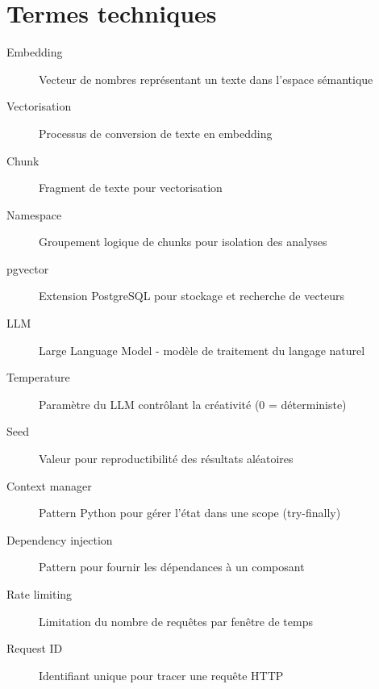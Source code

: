 \documentclass[12pt,a4paper,oneside]{book}
\begin{document}
\section{Termes techniques}

\begin{description}
    \item[Embedding] Vecteur de nombres représentant un texte dans l'espace sémantique
    
    \item[Vectorisation] Processus de conversion de texte en embedding
    
    \item[Chunk] Fragment de texte pour vectorisation
    
    \item[Namespace] Groupement logique de chunks pour isolation des analyses
    
    \item[pgvector] Extension PostgreSQL pour stockage et recherche de vecteurs
    
    \item[LLM] Large Language Model - modèle de traitement du langage naturel
    
    \item[Temperature] Paramètre du LLM contrôlant la créativité (0 = déterministe)
    
    \item[Seed] Valeur pour reproductibilité des résultats aléatoires
    
    \item[Context manager] Pattern Python pour gérer l'état dans une scope (try-finally)
    
    \item[Dependency injection] Pattern pour fournir les dépendances à un composant
    
    \item[Rate limiting] Limitation du nombre de requêtes par fenêtre de temps
    
    \item[Request ID] Identifiant unique pour tracer une requête HTTP
\end{description}
\end{document}
